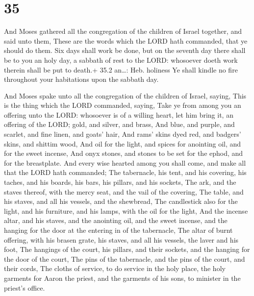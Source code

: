 \hypertarget{section-34}{%
\section{35}\label{section-34}}

 And Moses gathered all the congregation of the children of
Israel together, and said unto them, These are the words which the LORD
hath commanded, that ye should do them.  Six days shall work
be done, but on the seventh day there shall be to you an holy day, a
sabbath of rest to the LORD: whosoever doeth work therein shall be put
to death.+ 35.2 an\ldots: Heb. holiness  Ye shall kindle no
fire throughout your habitations upon the sabbath day.

 And Moses spake unto all the congregation of the children
of Israel, saying, This is the thing which the LORD commanded, saying,
 Take ye from among you an offering unto the LORD: whosoever
is of a willing heart, let him bring it, an offering of the LORD; gold,
and silver, and brass,  And blue, and purple, and scarlet,
and fine linen, and goats' hair,  And rams' skins dyed red,
and badgers' skins, and shittim wood,  And oil for the
light, and spices for anointing oil, and for the sweet incense,
 And onyx stones, and stones to be set for the ephod, and
for the breastplate.  And every wise hearted among you
shall come, and make all that the LORD hath commanded;  The
tabernacle, his tent, and his covering, his taches, and his boards, his
bars, his pillars, and his sockets,  The ark, and the
staves thereof, with the mercy seat, and the vail of the covering,
 The table, and his staves, and all his vessels, and the
shewbread,  The candlestick also for the light, and his
furniture, and his lamps, with the oil for the light,  And
the incense altar, and his staves, and the anointing oil, and the sweet
incense, and the hanging for the door at the entering in of the
tabernacle,  The altar of burnt offering, with his brasen
grate, his staves, and all his vessels, the laver and his foot,
 The hangings of the court, his pillars, and their sockets,
and the hanging for the door of the court,  The pins of the
tabernacle, and the pins of the court, and their cords, 
The cloths of service, to do service in the holy place, the holy
garments for Aaron the priest, and the garments of his sons, to minister
in the priest's office.

